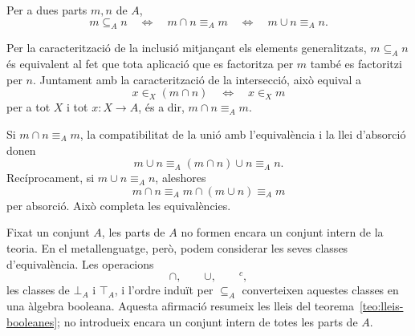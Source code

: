 \begin{proposicio}\label{prop:inclusio-booleana}
Per a dues parts \(m,n\) de \(A\),
\[
m\subseteq_A n
\quad\Longleftrightarrow\quad
m\cap n\equiv_A m
\quad\Longleftrightarrow\quad
m\cup n\equiv_A n.
\]
\end{proposicio}

\begin{prova}
Per la caracterització de la inclusió mitjançant els elements
generalitzats,
\(m\subseteq_A n\) és equivalent al fet que tota aplicació que es
factoritza per \(m\) també es factoritzi per \(n\). Juntament amb la
caracterització de la intersecció, això equival a
\[
x\in_X(m\cap n)
\quad\Longleftrightarrow\quad
x\in_Xm
\]
per a tot \(X\) i tot \(x:X\to A\), és a dir,
\(m\cap n\equiv_A m\).

Si \(m\cap n\equiv_A m\), la compatibilitat de la unió amb
l'equivalència i la llei d'absorció donen
\[
m\cup n
\equiv_A
(m\cap n)\cup n
\equiv_A n.
\]
Recíprocament, si \(m\cup n\equiv_A n\), aleshores
\[
m\cap n
\equiv_A
m\cap(m\cup n)
\equiv_A m
\]
per absorció. Això completa les equivalències.
\end{prova}

\begin{observacio}\label{obs:algebra-booleana-parts}
Fixat un conjunt \(A\), les parts de \(A\) no formen encara un conjunt
intern de la teoria. En el metallenguatge, però, podem considerar les
seves classes d'equivalència. Les operacions
\[
\cap,\qquad\cup,\qquad{}^c,
\]
les classes de \(\bot_A\) i \(\top_A\), i l'ordre induït per
\(\subseteq_A\) converteixen aquestes classes en una àlgebra booleana.
Aquesta afirmació resumeix les lleis del
teorema~\ref{teo:lleis-booleanes}; no introdueix encara un conjunt
intern de totes les parts de \(A\).
\end{observacio}

